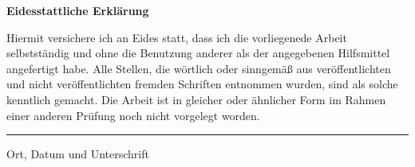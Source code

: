 \newpage
{}
\label{erklaerung}
\vspace*{1cm}

\vspace{1cm}

\Large{\textbf{Eidesstattliche Erklärung}}
\normalsize
\vspace{1cm}

Hiermit versichere ich an Eides statt, dass ich die vorliegenede Arbeit selbstständig
und ohne die Benutzung anderer als der angegebenen Hilfsmittel angefertigt habe. 
Alle Stellen, die wörtlich oder sinngemäß aus veröffentlichten und nicht veröffentlichten fremden Schriften entnommen wurden, sind als solche kenntlich gemacht. 
Die Arbeit ist in gleicher oder ähnlicher Form im Rahmen einer anderen Prüfung noch nicht vorgelegt worden.

\vspace*{3.5cm}

\begin{center}
    \rule{0.8\textwidth}{0.4pt}

Ort, Datum und Unterschrift\\

\end{center}
